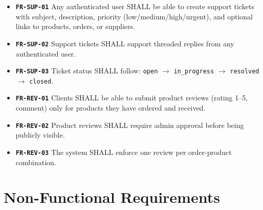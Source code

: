 ﻿\documentclass[12pt,a4paper]{report}
\newcommand{\req}[1]{\texttt{\textbf{\color{primary}#1}}}
\begin{document}
\begin{tcolorbox}[reqbox,title={FR-SUPPORT: Support and Review Requirements}]
\begin{itemize}[leftmargin=1.5em]
  \item \req{FR-SUP-01} Any authenticated user SHALL be able to create support tickets with subject, description, priority (low/medium/high/urgent), and optional links to products, orders, or suppliers.
  \item \req{FR-SUP-02} Support tickets SHALL support threaded replies from any authenticated user.
  \item \req{FR-SUP-03} Ticket status SHALL follow: \texttt{open} $\to$ \texttt{in\_progress} $\to$ \texttt{resolved} $\to$ \texttt{closed}.
  \item \req{FR-REV-01} Clients SHALL be able to submit product reviews (rating 1--5, comment) only for products they have ordered and received.
  \item \req{FR-REV-02} Product reviews SHALL require admin approval before being publicly visible.
  \item \req{FR-REV-03} The system SHALL enforce one review per order-product combination.
\end{itemize}
\end{tcolorbox}

\section{Non-Functional Requirements}
\end{document}
